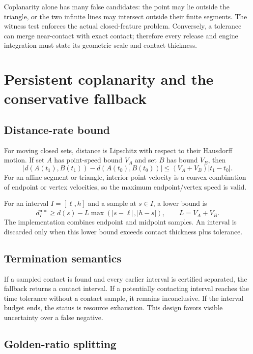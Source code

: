 \documentclass[11pt,a4paper,oneside]{book}
\begin{document}
Coplanarity alone has many false candidates: the point may lie outside the triangle, or the two infinite lines may intersect outside their finite segments. The witness test enforces the actual closed-feature problem. Conversely, a tolerance can merge near-contact with exact contact; therefore every release and engine integration must state its geometric scale and contact thickness.

\chapter{Persistent coplanarity and the conservative fallback}
\section{Distance-rate bound}

For moving closed sets, distance is Lipschitz with respect to their Hausdorff motion. If set $A$ has point-speed bound $V_A$ and set $B$ has bound $V_B$, then
\begin{equation}
  |d(A(t_1),B(t_1))-d(A(t_0),B(t_0))|\leq(V_A+V_B)|t_1-t_0|.
  \label{eq:lipschitz}
\end{equation}
For an affine segment or triangle, interior-point velocity is a convex combination of endpoint or vertex velocities, so the maximum endpoint/vertex speed is valid.

For an interval $I=[\ell,h]$ and a sample at $s\in I$, a lower bound is
\[
  d_I^{\min}\geq d(s)-L\max(|s-\ell|,|h-s|),\qquad L=V_A+V_B.
\]
The implementation combines endpoint and midpoint samples. An interval is discarded only when this lower bound exceeds contact thickness plus tolerance.

\section{Termination semantics}

If a sampled contact is found and every earlier interval is certified separated, the fallback returns a contact interval. If a potentially contacting interval reaches the time tolerance without a contact sample, it remains inconclusive. If the interval budget ends, the status is resource exhaustion. This design favors visible uncertainty over a false negative.

\section{Golden-ratio splitting}
\end{document}
